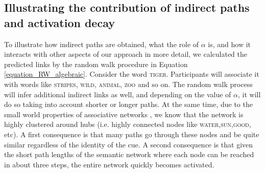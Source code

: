 \documentclass[doc]{apa6}
\newcommand{\stimulus}[1]{\textsc{#1}}
\begin{document}
\subsection{Illustrating the contribution of indirect paths and activation decay}
To illustrate how indirect paths are obtained, what the role of $\alpha$ is, and how it interacts with other aspects of our approach in more detail, we calculated the predicted links by the random walk procedure in Equation \ref{equation_RW_algebraic}. Consider the word \stimulus{tiger}. Participants will associate it with words like \stimulus{stripes}, \stimulus{wild}, \stimulus{animal}, \stimulus{zoo} and so on. The random walk process will infer additional indirect links as well, and depending on the value of $\alpha$, it will do so taking into account shorter or longer paths. At the same time, due to the small world properties of associative networks \parencite[see][]{Steyvers2005,DeDeyne2008b}, we know that the network is highly clustered around hubs (i.e. highly connected nodes like \stimulus{water},\stimulus{sun},\stimulus{good}, etc). A first consequence is that many paths go through these nodes and be quite similar regardless of the identity of the  cue. A second consequence is that given the short path lengths of the semantic network where each node can be reached in about three steps, the entire network quickly becomes activated.
\end{document}
